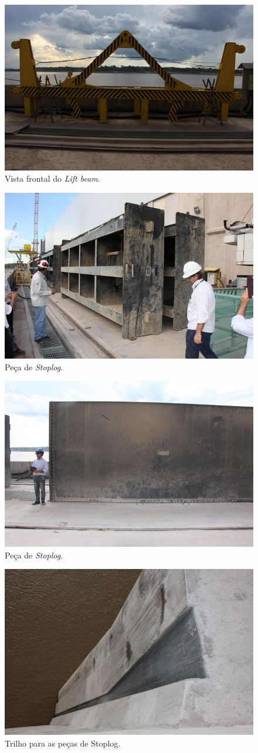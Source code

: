 \begin{figure}[h!]
    \centering \includegraphics[width=0.6\columnwidth]{figs/jirau/jirau_11}
    \caption{Vista frontal do \emph{Lift beam}.}
    \label{fig:jirau11}
\end{figure}

\begin{figure}[h!]
    \centering \includegraphics[width=0.6\columnwidth]{figs/jirau/jirau_13}
    \caption{Peça de \emph{Stoplog}.}
    \label{fig:jirau13}
\end{figure}

\begin{figure}[h!]
    \centering \includegraphics[width=0.6\columnwidth]{figs/jirau/jirau_14}
    \caption{Peça de \emph{Stoplog}.}
    \label{fig:jirau14}
\end{figure}

\begin{figure}[h!]
    \centering \includegraphics[width=0.6\columnwidth]{figs/jirau/jirau_15}
    \caption{Trilho para as peças de Stoplog.}
    \label{fig:jirau15}
\end{figure}

